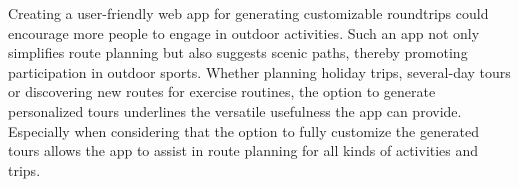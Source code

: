 Creating a user-friendly web app for generating customizable roundtrips could encourage more people to engage in outdoor activities.
Such an app not only simplifies route planning but also suggests scenic paths, thereby promoting participation in outdoor sports.
Whether planning holiday trips, several-day tours or discovering new routes for exercise routines, the option to generate personalized tours underlines the versatile usefulness the app can provide.
Especially when considering that the option to fully customize the generated tours allows the app to assist in route planning for all kinds of activities and trips.





